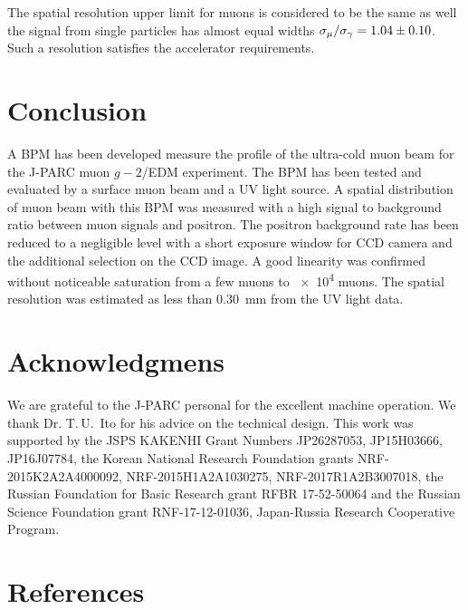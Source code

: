 \documentclass[preprint,3p,twocolumn]{elsarticle}
\begin{document}
The spatial resolution upper limit for muons is considered to be the same as well the signal from single particles has almost equal widths
$\sigma_{\mu} / \sigma_{\gamma} = \num{1.04 \pm 0.10}$.
Such a resolution satisfies the accelerator requirements.


\section{Conclusion}

A BPM has been developed measure the profile of  the ultra-cold muon beam 
for the J-PARC muon $g-2$/EDM experiment. 
The BPM has been tested and evaluated by a surface muon beam and a UV light source.
A spatial distribution of muon beam with this BPM was measured with
a high signal to background ratio between muon signals and positron.
The positron background rate has been reduced to a negligible level with 
a short exposure window for CCD camera and the additional selection on the CCD image.
A good linearity was confirmed without noticeable saturation from a few muons to \num{e4} muons.
The spatial resolution was estimated as less than \SI{.30}{\mm} from the UV light data.


\section*{Acknowledgmens}

We are grateful to the J-PARC personal for the excellent machine operation.
We thank Dr. T.\,U.~Ito for his advice on the technical design.
This work was supported by 
the JSPS KAKENHI Grant Numbers JP26287053, JP15H03666, JP16J07784,
the Korean National Research Foundation grants NRF-2015K2A2A4000092, NRF-2015H1A2A1030275, NRF-2017R1A2B3007018,
the Russian Foundation for Basic Research grant RFBR 17-52-50064 and
the Russian Science Foundation grant RNF-17-12-01036,
Japan-Russia Research Cooperative Program.

\section*{References}


\end{document}
